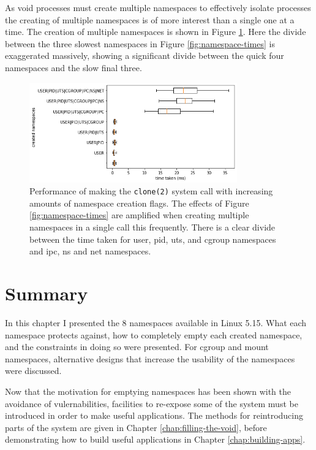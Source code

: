 \documentclass[12pt,a4paper,twoside]{report}
\begin{document}
As void processes must create multiple namespaces to effectively isolate processes the creating of multiple namespaces is of more interest than a single one at a time. The creation of multiple namespaces is shown in Figure \ref{fig:namespace-stacked-times}. Here the divide between the three slowest namespaces in Figure \ref{fig:namespace-times} is exaggerated massively, showing a significant divide between the quick four namespaces and the slow final three. 

\begin{figure}
    \centering
    \includegraphics[width=0.8\textwidth]{graphs/namespace_stacked_times.png}

    \caption{Performance of making the \texttt{clone(2)} system call with increasing amounts of namespace creation flags. The effects of Figure \ref{fig:namespace-times} are amplified when creating multiple namespaces in a single call this frequently. There is a clear divide between the time taken for user, pid, uts, and cgroup namespaces and ipc, ns and net namespaces.}
    \label{fig:namespace-stacked-times}
\end{figure}

\section{Summary}

In this chapter I presented the 8 namespaces available in Linux 5.15. What each namespace protects against, how to completely empty each created namespace, and the constraints in doing so were presented. For cgroup and mount namespaces, alternative designs that increase the usability of the namespaces were discussed.

Now that the motivation for emptying namespaces has been shown with the avoidance of vulernabilities, facilities to re-expose some of the system must be introduced in order to make useful applications. The methods for reintroducing parts of the system are given in Chapter \ref{chap:filling-the-void}, before demonstrating how to build useful applications in Chapter \ref{chap:building-apps}.
\end{document}
